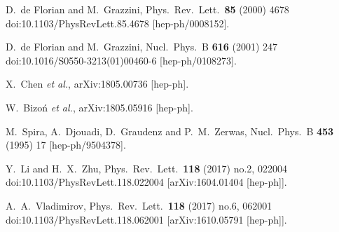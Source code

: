 \documentclass[12pt]{article}
\begin{document}
\begin{thebibliography}{99}
  D.~de Florian and M.~Grazzini,
  Phys.\ Rev.\ Lett.\  {\bf 85} (2000) 4678
  doi:10.1103/PhysRevLett.85.4678
  [hep-ph/0008152].

  D.~de Florian and M.~Grazzini,
  Nucl.\ Phys.\ B {\bf 616} (2001) 247
  doi:10.1016/S0550-3213(01)00460-6
  [hep-ph/0108273].
  
  
  X.~Chen {\it et al.},
  arXiv:1805.00736 [hep-ph].

  W.~Bizoń {\it et al.},
  arXiv:1805.05916 [hep-ph].

  

  M.~Spira, A.~Djouadi, D.~Graudenz and P.~M.~Zerwas,
  Nucl.\ Phys.\ B {\bf 453} (1995) 17
  [hep-ph/9504378].

  Y.~Li and H.~X.~Zhu,
  Phys.\ Rev.\ Lett.\  {\bf 118} (2017) no.2,  022004
  doi:10.1103/PhysRevLett.118.022004
  [arXiv:1604.01404 [hep-ph]].
  
  A.~A.~Vladimirov,
  Phys.\ Rev.\ Lett.\  {\bf 118} (2017) no.6,  062001
  doi:10.1103/PhysRevLett.118.062001
  [arXiv:1610.05791 [hep-ph]].
  

\end{thebibliography}
\end{document}
